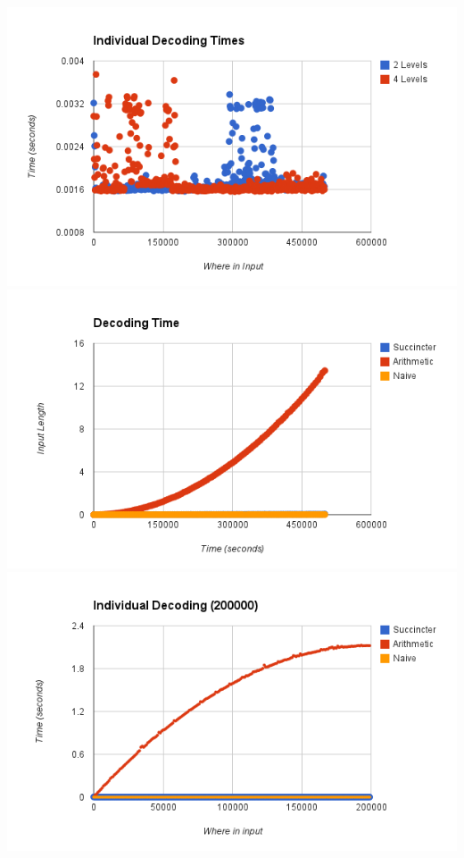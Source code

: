 \documentclass{article}
\begin{document}
\includegraphics[scale=0.8]{images/individual_decodetime}\\
\includegraphics[scale=0.8]{images/decoding_time}\\
\includegraphics[scale=0.8]{images/individual_decode_20000}\\
\end{document}
